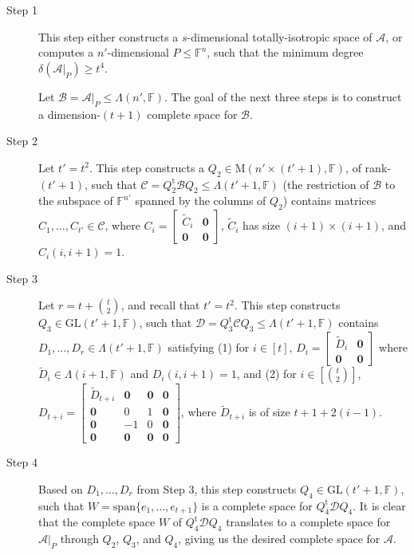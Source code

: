 \documentclass[10pt]{article}
\newcommand{\tuple}[1]{\mathbf{#1}}
\newcommand{\spa}[1]{\mathcal{#1}}
\newcommand{\GL}{\mathrm{GL}}
\newcommand{\F}{\mathbb{F}}
\newcommand{\M}{\mathrm{M}}
\renewcommand{\span}{\mathrm{span}}
\newcommand{\cA}{\spa{A}}
\newcommand{\cB}{\spa{B}}
\newcommand{\cC}{\spa{C}}
\newcommand{\cD}{\spa{D}}
\newcommand{\vzero}{\tuple{0}}
\newcommand{\tr}[1]{#1^{\mathrm{t}}}
\begin{document}
\begin{description}
\item[Step 1] This step either constructs a $s$-dimensional 
totally-isotropic space of $\cA$, or computes a $n'$-dimensional $P\leq \F^n$, 
such that the minimum degree $\delta(\cA|_P)\geq t^4$. 

Let $\cB=\cA|_P\leq\Lambda(n', \F)$. The goal of the next three steps is to 
construct a dimension-$(t+1)$ complete space for $\cB$.

\item[Step 2] Let $t'=t^2$. This step
constructs a 
$Q_2\in \M(n'\times (t'+1), \F)$, of rank-$(t'+1)$, such that $\cC=\tr{Q_2}\cB 
Q_2\leq 
\Lambda(t'+1, \F)$ (the restriction of $\cB$ to the subspace of $\F^{n'}$ spanned 
by the columns of $Q_2$) contains matrices $C_1, \dots, C_{t'}\in \cC$, where
$C_i=\begin{bmatrix}
\tilde C_i & \vzero \\
\vzero & \vzero 
\end{bmatrix}$, $\tilde C_i$ has size $(i+1)\times (i+1)$, and $C_i(i, 
i+1)=1$.

\item[Step 3] Let $r=t+\binom{t}{2}$, and recall that $t'=t^2$. This step 
constructs
$Q_3\in\GL(t'+1, \F)$, such that $\cD=\tr{Q_3}\cC Q_3\leq 
\Lambda(t'+1, 
\F)$ contains 
$D_1, 
\dots, D_r\in \Lambda(t'+1, \F)$ satisfying (1) for $i\in [t]$, 
$D_i=\begin{bmatrix}
\tilde D_i & \vzero \\
\vzero & \vzero 
\end{bmatrix}$ where $\tilde D_i\in \Lambda(i+1, \F)$ and $D_i(i, i+1)=1$,  
and 
(2) for 
$i\in[\binom{t}{2}]$, $D_{t+i}=\begin{bmatrix}
\tilde D_{t+i} & \vzero & \vzero & \vzero \\
\vzero & 0 & 1 & \vzero \\
\vzero & -1 & 0 & \vzero \\
\vzero & \vzero & \vzero & \vzero 
\end{bmatrix}$, where $\tilde D_{t+i}$ is of size $t+1+2(i-1)$.

\item[Step 4] 
Based on $D_1, \dots, D_r$ from Step 3, this step constructs $Q_4\in\GL(t'+1, 
\F)$, such that $W=\span\{ e_1, \dots, e_{t+1}\}$ is a complete space for 
$\tr{Q_4}\cD Q_4$. 
It is clear that the complete space $W$ of $\tr{Q_4}\cD Q_4$ translates to a 
complete space for $\cA|_P$ through $Q_2$, $Q_3$, and $Q_4$, giving us the desired 
complete 
space for $\cA$.
%
%
%
%
%
%
%
%
%
%
%
%
%
%
%
\end{description}
\end{document}
